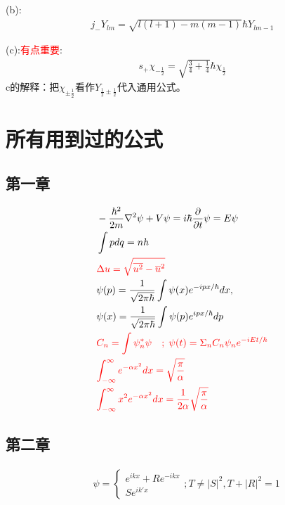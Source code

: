 \documentclass[10pt,journal,compsoc]{IEEEtran}
\begin{document}
(b):\begin{align}
  j_-Y_{lm}=\sqrt{l(l+1)-m(m-1)}\hbar Y_{lm-1}
\end{align}

(c):\textcolor{red}{有点重要}:\begin{align}
  s_+\chi_{-\frac12}=\sqrt{\frac34+\frac14}\hbar \chi_{\frac12}
\end{align}
c的解释：把$\chi_{\pm\frac12}$看作$Y_{\frac12\pm\frac12}$代入通用公式。

\newpage

\section{所有用到过的公式}

\subsection{第一章}

\begin{align*}
  &-\frac{\hbar^2}{2m}\nabla^2\psi+V\psi=i\hbar\frac{ \partial }{ \partial t}\psi=E\psi \\
  & \int pdq=nh \\
  &\textcolor{red}{\Delta u=\sqrt{\overline{u^2}-\overline{u}^2}} \\
  &\psi(p)=\frac1{\sqrt{2\pi\hbar}}\int\psi(x)e^{-ipx/\hbar}dx,\\ &\psi(x)=\frac1{\sqrt{2\pi\hbar}}\int \psi(p)e^{ipx/\hbar}dp \\
  &\textcolor{red}{ C_n=\int \psi^*_n \psi \quad ;\;\psi(t)=\Sigma_n C_n\psi_n e^{-iEt/\hbar}} \\
  &\textcolor{red}{ \int^{\infty}_{-\infty}e^{-\alpha x^2}dx=\sqrt{\frac{\pi}{\alpha}} }\\
  &\textcolor{red}{ \int^{\infty}_{-\infty}x^2e^{-\alpha x^2}dx=\frac{1}{2\alpha}\sqrt{\frac{\pi}{\alpha}}} \\
\end{align*}

\subsection{第二章}

\begin{align*}
  & \psi=\begin{cases}e^{ikx}+Re^{-ikx}\\ Se^{ik'x}\end{cases};T\ne |S|^2,T+|R|^2=1 \\
\end{align*}
\end{document}
